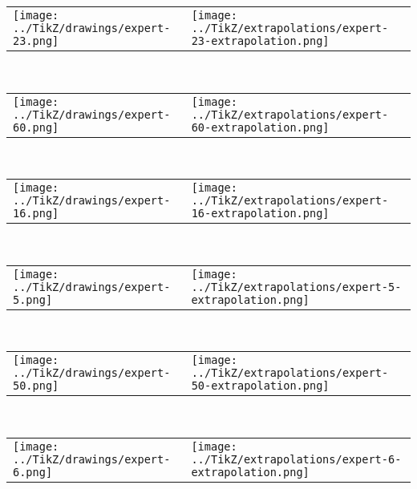            \begin{tabular}{ll}
    \texttt{[image: ../TikZ/drawings/expert-23.png]}&
    \texttt{[image: ../TikZ/extrapolations/expert-23-extrapolation.png]}
    \end{tabular}        
            \\

            \begin{tabular}{ll}
    \texttt{[image: ../TikZ/drawings/expert-60.png]}&
    \texttt{[image: ../TikZ/extrapolations/expert-60-extrapolation.png]}
    \end{tabular}        
            \\

            \begin{tabular}{ll}
    \texttt{[image: ../TikZ/drawings/expert-16.png]}&
    \texttt{[image: ../TikZ/extrapolations/expert-16-extrapolation.png]}
    \end{tabular}        
            \\

            \begin{tabular}{ll}
    \texttt{[image: ../TikZ/drawings/expert-5.png]}&
    \texttt{[image: ../TikZ/extrapolations/expert-5-extrapolation.png]}
    \end{tabular}        
            \\

            \begin{tabular}{ll}
    \texttt{[image: ../TikZ/drawings/expert-50.png]}&
    \texttt{[image: ../TikZ/extrapolations/expert-50-extrapolation.png]}
    \end{tabular}        
            \\

            \begin{tabular}{ll}
    \texttt{[image: ../TikZ/drawings/expert-6.png]}&
    \texttt{[image: ../TikZ/extrapolations/expert-6-extrapolation.png]}
    \end{tabular}        
            